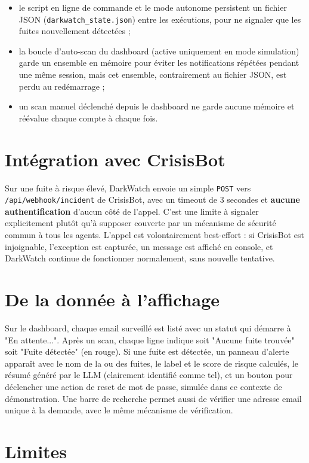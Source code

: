 \documentclass[12pt,a4paper]{report}
\newcommand{\code}[1]{\nolinkurl{#1}}
\begin{document}
\begin{itemize}[nosep]
\item le script en ligne de commande et le mode autonome persistent un fichier JSON (\texttt{darkwatch\_state.json}) entre les exécutions, pour ne signaler que les fuites nouvellement détectées ;
\item la boucle d'auto-scan du dashboard (active uniquement en mode simulation) garde un ensemble en mémoire pour éviter les notifications répétées pendant une même session, mais cet ensemble, contrairement au fichier JSON, est perdu au redémarrage ;
\item un scan manuel déclenché depuis le dashboard ne garde aucune mémoire et réévalue chaque compte à chaque fois.
\end{itemize}

\section{Intégration avec CrisisBot}

Sur une fuite à risque élevé, DarkWatch envoie un simple \texttt{POST} vers \code{/api/webhook/incident} de CrisisBot, avec un timeout de 3 secondes et \textbf{aucune authentification} d'aucun côté de l'appel. C'est une limite à signaler explicitement plutôt qu'à supposer couverte par un mécanisme de sécurité commun à tous les agents. L'appel est volontairement best-effort : si CrisisBot est injoignable, l'exception est capturée, un message est affiché en console, et DarkWatch continue de fonctionner normalement, sans nouvelle tentative.

\section{De la donnée à l'affichage}

Sur le dashboard, chaque email surveillé est listé avec un statut qui démarre à "En attente...". Après un scan, chaque ligne indique soit "Aucune fuite trouvée" soit "Fuite détectée" (en rouge). Si une fuite est détectée, un panneau d'alerte apparaît avec le nom de la ou des fuites, le label et le score de risque calculés, le résumé généré par le LLM (clairement identifié comme tel), et un bouton pour déclencher une action de reset de mot de passe, simulée dans ce contexte de démonstration. Une barre de recherche permet aussi de vérifier une adresse email unique à la demande, avec le même mécanisme de vérification.

\section{Limites}
\end{document}
